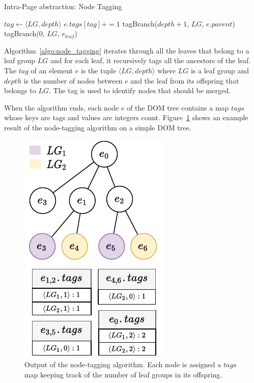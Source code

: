 \begin{algorithm}
\caption{Intra-Page abstraction: Node Tagging}\label{appstract:alg:intra_tagging}
\begin{algorithmic}[1]
      \State $tag \gets \langle LG, depth \rangle$
      \State $e.tags[tag] += 1$ 
      \State tagBranch($depth + 1$, $LG$, $e.parent$)
    \EndFunction
        \State tagBranch(0, $LG$, $e_{leaf}$) 
      \EndFor
    \EndFor
  \EndFunction
\end{algorithmic}
\label{algo:node_tagging}
\end{algorithm}

Algorithm~\ref{algo:node_tagging} iterates through all the leaves that belong to a leaf group $LG$ and for each leaf, it recursively tags all the ancestors of the leaf. 
The $tag$ of an element $e$ is the tuple $\langle LG, depth \rangle$ where $LG$ is a leaf group and $depth$ is the number of nodes between $e$ and the leaf from its offspring that belongs to $LG$.
The tag is used to identify nodes that should be merged.

When the algorithm ends, each node $e$ of the DOM tree contains a map $tags$ whose keys are tags and values are integers count. 
Figure~\ref{fig:node_tagging} shows an example result of the node-tagging algorithm on a simple DOM tree. 

\begin{figure}[ht]
  \centering
  \includegraphics[width=0.5\linewidth]{appstract/explanations/node-tagging}
  \caption{Output of the node-tagging algorithm. Each node is assigned a $tags$ map keeping track of the number of leaf groups in its offspring.}
  \label{fig:node_tagging}
\end{figure}

